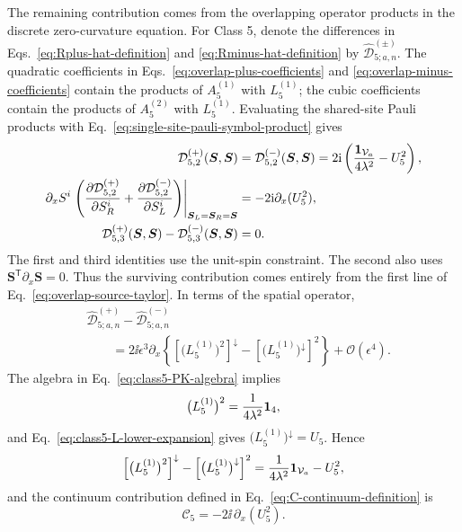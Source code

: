The remaining contribution comes from the overlapping operator products in
the discrete zero-curvature equation.  For Class 5, denote the differences
in Eqs.~\eqref{eq:Rplus-hat-definition} and
\eqref{eq:Rminus-hat-definition} by
$\widehat{\mathcal D}^{(\pm)}_{5;a,n}$.  The quadratic coefficients in
Eqs.~\eqref{eq:overlap-plus-coefficients} and
\eqref{eq:overlap-minus-coefficients} contain the products of
$A_5^{(1)}$ with $L_5^{(1)}$; the cubic coefficients contain the
products of $A_5^{(2)}$ with $L_5^{(1)}$.  Evaluating the shared-site
Pauli products with Eq.~\eqref{eq:single-site-pauli-symbol-product}
gives
\begin{align}
\mathcal D^{(+)}_{5,2}(\boldsymbol S,\boldsymbol S)
&=\mathcal D^{(-)}_{5,2}(\boldsymbol S,\boldsymbol S)
=2\mathrm{i}\left(\frac{\mathbf{1}_{\mathcal V_a}}{4\lambda^2}-U_5^2\right),
\label{eq:class5-coincident-quadratic-overlap}\\
\partial_x S^i
\left.
\left(
\frac{\partial\mathcal D^{(+)}_{5,2}}{\partial S_R^i}
+\frac{\partial\mathcal D^{(-)}_{5,2}}{\partial S_L^i}
\right)\right|_{\boldsymbol S_L=\boldsymbol S_R=\boldsymbol S}
&=-2\mathrm{i}\partial_x(U_5^2),
\label{eq:class5-quadratic-overlap-taylor}\\
\mathcal D^{(+)}_{5,3}(\boldsymbol S,\boldsymbol S)
-\mathcal D^{(-)}_{5,3}(\boldsymbol S,\boldsymbol S)
&=0.
\label{eq:class5-coincident-cubic-overlap}
\end{align}
The first and third identities use the unit-spin constraint.  The
second also uses $\boldsymbol S^{\mathsf T}\partial_x\boldsymbol S=0$.
Thus the surviving contribution comes entirely from the first line of
Eq.~\eqref{eq:overlap-source-taylor}.  In terms of the spatial operator,
\begin{align}
&\widehat{\mathcal D}^{(+)}_{5;a,n}
-\widehat{\mathcal D}^{(-)}_{5;a,n}
\nonumber\\
&\qquad=
2\ii\epsilon^3\partial_x
\left\{
\left[\bigl(L^{(1)}_5\bigr)^2\right]^\downarrow
-\left[\bigl(L^{(1)}_5\bigr)^\downarrow\right]^2
\right\}
+\mathcal O(\epsilon^4).
\label{eq:class5-product-difference-expansion}
\end{align}
The algebra in Eq.~\eqref{eq:class5-PK-algebra} implies
\begin{equation}
\bigl(L^{(1)}_5\bigr)^2
=
\frac{1}{4\lambda^2}\mathbf{1}_4,
\label{eq:class5-L1-square}
\end{equation}
and Eq.~\eqref{eq:class5-L-lower-expansion} gives
$\bigl(L^{(1)}_5\bigr)^\downarrow=U_5$.  Hence
\begin{equation}
\left[\bigl(L^{(1)}_5\bigr)^2\right]^\downarrow
-\left[\bigl(L^{(1)}_5\bigr)^\downarrow\right]^2
=
\frac{1}{4\lambda^2}\mathbf{1}_{\mathcal V_a}-U_5^2,
\label{eq:class5-symbol-square-difference}
\end{equation}
and the continuum contribution defined in
Eq.~\eqref{eq:C-continuum-definition} is
\begin{equation}
\mathcal C_5
=-2\ii\,\partial_x(U_5^2).
\label{eq:class5-shared-site-correction}
\end{equation}


